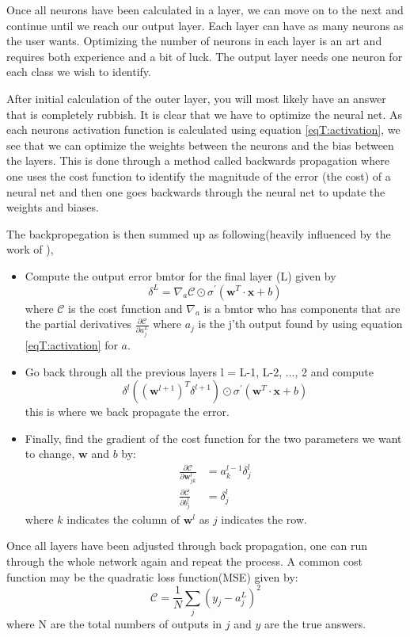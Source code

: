 Once all neurons have been calculated in a layer, we can move on to the next and continue until we reach our output layer. Each layer can have as many neurons as the user wants. Optimizing the number of neurons in each layer is an art and requires both experience and a bit of luck. The output layer needs one neuron for each class we wish to identify.

After initial calculation of the outer layer, you will most likely have an answer that is completely rubbish. It is clear that we have to optimize the neural net. As each neurons activation function is calculated using equation \eqref{eqT:activation}, we see that we can optimize the weights between the neurons and the bias between the layers. This is done through a method called backwards propagation where one uses the cost function to identify the magnitude of the error (the cost) of a neural net and then one goes backwards through the neural net to update the weights and biases.

The backpropegation is then summed up as following(heavily influenced by the work of \citet{Nielsen}),
\begin{itemize}
    \item Compute the output error bmtor for the final layer (L) given by
    \begin{equation*}
        \delta^L = \nabla_a \mathcal{C} \odot \sigma^{'}(\bm{w}^T \cdot \bm{x} + b)
    \end{equation*}
    where $\mathcal{C}$ is the cost function and $\nabla_a$ is a bmtor who has components that are the partial derivatives $\frac{\partial \mathcal{C}}{\partial a_j^L}$ where $a_j$ is the j'th output found by using equation \eqref{eqT:activation} for $a$.
    \item Go back through all the previous layers l = L-1, L-2, ..., 2 and compute
    \begin{equation*}
        \delta^l ((\bm{w}^{l + 1})^T \delta^{l + 1}) \odot \sigma^{'}(\bm{w}^T \cdot \bm{x} + b)
    \end{equation*}
    this is where we back propagate the error.
    \item Finally, find the gradient of the cost function for the two parameters we want to change, $\bm{w}$ and $b$ by:
    \begin{align*}
        \frac{\partial \mathcal{C}}{\partial \bm{w}_{jk}^l} &= a_k^{l-1}\delta_{j}^{l} \\
        \frac{\partial \mathcal{C}}{\partial b_{j}^l} &= \delta_{j}^{l}
    \end{align*}
    where $k$ indicates the column of $\bm{w}^l$ as $j$ indicates the row.
\end{itemize}
Once all layers have been adjusted through back propagation, one can run through the whole network again and repeat the process. A common cost function may be the quadratic loss function(MSE) given by:
\begin{equation}
    \mathcal{C} = \frac{1}{N} \sum\limits_{j} (y_j - a_j^L)^2
\end{equation}
where N are the total numbers of outputs in $j$ and $y$ are the true answers.

